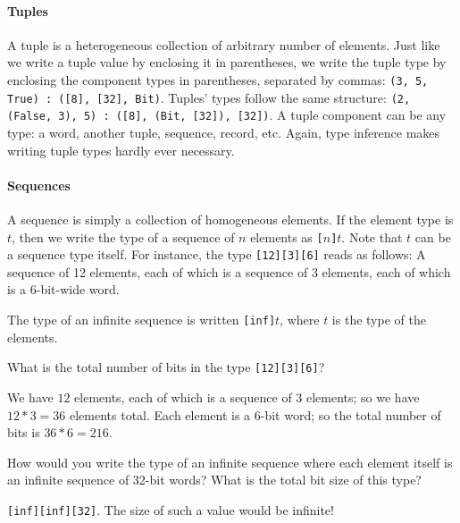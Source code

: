 \paragraph*{Tuples}\indTheTupleType A tuple is a heterogeneous
collection of arbitrary number of
elements. Just like we write a tuple value by enclosing it in
parentheses, we write the tuple type by enclosing the component types
in parentheses, separated by commas: \texttt{(3, 5, True) :\ ([8], [32],
  Bit)}. Tuples' types follow the same structure: \texttt{(2, (False, 3),
  5) :\ ([8], (Bit, [32]), [32])}.  A tuple component can be any type:
a word, another tuple, sequence, record, etc. Again, type inference
makes writing tuple types hardly ever necessary.\indTypeInference

\paragraph*{Sequences}\indTheSequenceType A sequence is simply a
collection of homogeneous elements. If the element type is $t$,
then we write the type of a sequence of $n$ elements as \texttt{[}$n$\texttt{]}$t$.
Note that $t$ can be a sequence type itself. For
instance, the type {\tt [12][3][6]} reads as follows: A sequence of
12 elements, each of which is a sequence of 3 elements, each of which
is a 6-bit-wide word.

The type of an infinite sequence is written \texttt{[inf]}$t$, where $t$
is the type of the elements.\indInfSeq \indInf

\begin{Exercise}\label{ex:types:1}
What is the total number of bits in the type {\tt [12][3][6]}?
\end{Exercise}
\begin{Answer}
  We have $12$ elements, each of which is a sequence of $3$ elements;
  so we have $12*3=36$ elements total. Each element is a 6-bit word;
  so the total number of bits is $36*6 = 216$.
\end{Answer}

\begin{Exercise}\label{ex:types:2}
  How would you write the type of an infinite sequence where each
  element itself is an infinite sequence of 32-bit words? What is the
  total bit size of this type?
\end{Exercise}
\begin{Answer} {\tt [inf][inf][32]}. The size of
  such a value would be infinite!
\end{Answer}

